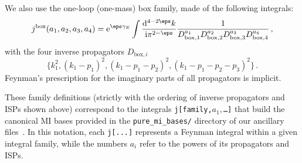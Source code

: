 %
We also use the one-loop (one-mass) box family, made of the following integrals:
\begin{equation}
	j^{\rm box}(a_1, a_2, a_3, a_4) = \mathrm{e}^{\eps \gamma_{E}} \int \frac{\mathrm{d}^{4-2\eps} k}{\mathrm{i} \pi^{2-\eps}} \frac{1}{D_{\mathrm{box}, 1}^{a_1} D_{\mathrm{box},2}^{a_2} D_{\mathrm{box},3}^{a_3} D_{\mathrm{box},4}^{a_4}} \,,
\end{equation}
with the four inverse propagators $D_{\mathrm{box},i}$
	\begin{equation}
		\big\{k_1^2, (k_1-p_1)^2, (k_1-p_1-p_2)^2, (k_1-p_1-p_2-p_3)^2 \big\} \,.
	\end{equation}
Feynman's prescription for the imaginary parts of all propagators is implicit.

These family definitions (strictly with the ordering of inverse propagators and \acp{ISP} shown above) correspond to the integrals \texttt{j[family,$a_1,$\ldots]} that build the canonical \ac{MI} bases provided in the \texttt{pure\_mi\_bases/} directory of our ancillary files~\cite{zenodo}. In this notation, each \texttt{j[...]} represents a Feynman integral within a given integral family, while the numbers $a_i$ refer to the powers of its propagators and \acp{ISP}.

